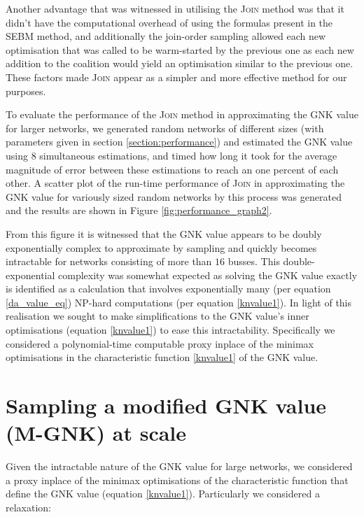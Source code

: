 Another advantage that was witnessed in utilising the \textsc{Join} method was that it didn't have the computational overhead of using the formulas present in the \textsc{SEBM} method, and additionally the join-order sampling allowed each new optimisation that was called to be warm-started by the previous one as each new addition to the coalition would yield an optimisation similar to the previous one.
These factors made \textsc{Join} appear as a simpler and more effective method for our purposes.

To evaluate the performance of the \textsc{Join} method in approximating the GNK value for larger networks, we generated random networks of different sizes (with parameters given in section \ref{section:performance}) and estimated the GNK value using 8 simultaneous estimations, and timed how long it took for the average magnitude of error between these estimations to reach an one percent of each other.
A scatter plot of the run-time performance of \textsc{Join} in approximating the GNK value for variously sized random networks by this process was generated and the results are shown in Figure \ref{fig:performance_graph2}.


From this figure it is witnessed that the GNK value appears to be doubly exponentially complex to approximate by sampling and quickly becomes intractable for networks consisting of more than $16$ busses.
This double-exponential complexity was somewhat expected as solving the GNK value exactly is identified as a calculation that involves exponentially many (per equation \ref{da_value_eq}) NP-hard computations (per equation \ref{knvalue1}).
In light of this realisation we sought to make simplifications to the GNK value's inner optimisations (equation \ref{knvalue1}) to ease this intractability.
Specifically we considered a polynomial-time computable proxy inplace of the minimax optimisations in the characteristic function \eqref{knvalue1} of the GNK value.

\iffigures

\fi

\iffigures

\fi

\pagebreak
\section{Sampling a modified GNK value (M-GNK) at scale}\label{sec:modified_gnk}

Given the intractable nature of the GNK value for large networks, we considered a proxy inplace of the minimax optimisations of the characteristic function that define the GNK value (equation \ref{knvalue1}).
Particularly we considered a relaxation:

